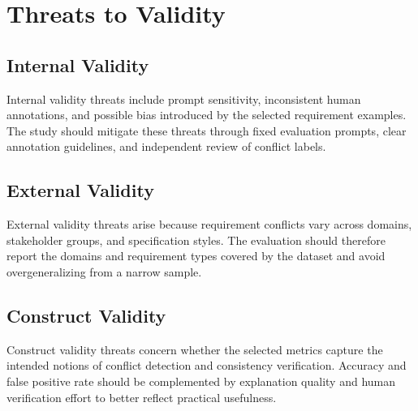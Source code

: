 \section{Threats to Validity}
\label{threats}

\subsection{Internal Validity}
Internal validity threats include prompt sensitivity, inconsistent human annotations,
and possible bias introduced by the selected requirement examples. The study should
mitigate these threats through fixed evaluation prompts, clear annotation guidelines,
and independent review of conflict labels.

\subsection{External Validity}
External validity threats arise because requirement conflicts vary across domains,
stakeholder groups, and specification styles. The evaluation should therefore report
the domains and requirement types covered by the dataset and avoid overgeneralizing
from a narrow sample.

\subsection{Construct Validity}
Construct validity threats concern whether the selected metrics capture the intended
notions of conflict detection and consistency verification. Accuracy and false
positive rate should be complemented by explanation quality and human verification
effort to better reflect practical usefulness.
